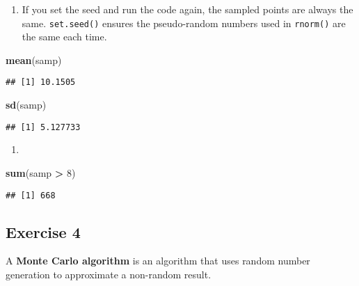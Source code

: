 \documentclass[
]{article}
\newenvironment{Shaded}{\begin{snugshade}}{\end{snugshade}}
\newcommand{\DecValTok}[1]{\textcolor[rgb]{0.00,0.00,0.81}{#1}}
\newcommand{\KeywordTok}[1]{\textcolor[rgb]{0.13,0.29,0.53}{\textbf{#1}}}
\newcommand{\NormalTok}[1]{#1}
\newcommand{\OperatorTok}[1]{\textcolor[rgb]{0.81,0.36,0.00}{\textbf{#1}}}
\newcommand{\StringTok}[1]{\textcolor[rgb]{0.31,0.60,0.02}{#1}}
\providecommand{\tightlist}{%
  \setlength{\itemsep}{0pt}\setlength{\parskip}{0pt}}
\begin{document}
\begin{enumerate}
\def\labelenumi{\arabic{enumi}.}
\setcounter{enumi}{2}
\tightlist
\item
  If you set the seed and run the code again, the sampled points are
  always the same. \texttt{set.seed()} ensures the pseudo-random numbers
  used in \texttt{rnorm()} are the same each time.
\end{enumerate}

\begin{Shaded}
\begin{Highlighting}[]
\KeywordTok{mean}\NormalTok{(samp)}
\end{Highlighting}
\end{Shaded}

\begin{verbatim}
## [1] 10.1505
\end{verbatim}

\begin{Shaded}
\begin{Highlighting}[]
\KeywordTok{sd}\NormalTok{(samp)}
\end{Highlighting}
\end{Shaded}

\begin{verbatim}
## [1] 5.127733
\end{verbatim}

\begin{enumerate}
\def\labelenumi{\arabic{enumi}.}
\setcounter{enumi}{3}
\tightlist
\item
\end{enumerate}

\begin{Shaded}
\begin{Highlighting}[]
\KeywordTok{sum}\NormalTok{(samp }\OperatorTok{\textgreater{}}\StringTok{ }\DecValTok{8}\NormalTok{)}
\end{Highlighting}
\end{Shaded}

\begin{verbatim}
## [1] 668
\end{verbatim}

\hypertarget{exercise-4}{%
\subsection{Exercise 4}\label{exercise-4}}

A \textbf{Monte Carlo algorithm} is an algorithm that uses random number
generation to approximate a non-random result.
\end{document}
